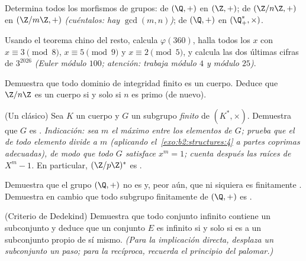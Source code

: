 \begin{exercise}[$\star\star$]\label{exo:b2:structures:7}
Determina todos los morfismos de grupos: de $(\Q, +)$ en $(\Z, +)$;
de $(\Z/n\Z, +)$ en $(\Z/m\Z, +)$ \emph{(cuéntalos: hay
$\gcd(m,n)$)}; de $(\Q, +)$ en $(\Q_+^*, \times)$.
\end{exercise}

\begin{exercise}[$\star\star$]\label{exo:b2:structures:8}
Usando el teorema chino del resto, calcula $\varphi(360)$, halla
todos los $x$ con $x \equiv 3 \pmod 8$, $x \equiv 5 \pmod 9$ y $x
\equiv 2 \pmod 5$, y calcula las dos últimas cifras de $3^{2026}$
\emph{(Euler módulo $100$; atención: trabaja módulo $4$ y módulo
$25$)}.
\end{exercise}

\begin{exercise}[$\star\star\star$]\label{exo:b2:structures:9}
Demuestra que todo dominio de integridad finito es un cuerpo. Deduce
que $\Z/n\Z$ es un cuerpo si y solo si $n$ es primo (de nuevo).
\end{exercise}

\begin{exercise}[$\star\star\star$]\label{exo:b2:structures:10}
(Un clásico) Sea $K$ un cuerpo y $G$ un subgrupo \emph{finito} de
$(K^*, \times)$. Demuestra que $G$ es .
\emph{Indicación: sea $m$ el  máximo entre los elementos de
$G$; prueba que el  de todo elemento divide a $m$ (aplicando el~\cref{exo:b2:structures:4} a partes coprimas adecuadas), de modo que
todo $G$ satisface $x^m = 1$; cuenta después las raíces de $X^m -
1$.} En particular, $(\Z/p\Z)^*$ es .
\end{exercise}

\begin{exercise}[$\star\star\star$]\label{exo:b2:structures:11}
Demuestra que el grupo $(\Q, +)$ no es  y, peor aún, que ni
siquiera es finitamente . Demuestra en cambio que todo
subgrupo finitamente  de $(\Q, +)$ es .
\end{exercise}

\begin{exercise}[$\star\star$]\label{exo:b2:structures:12}
(Criterio de Dedekind) Demuestra que todo conjunto infinito contiene
un subconjunto  y deduce que un conjunto $E$ es infinito si y
solo si es  a un subconjunto propio de sí mismo. \emph{(Para
la implicación directa, desplaza un subconjunto  un paso;
para la recíproca, recuerda el principio del palomar.)}
\end{exercise}


